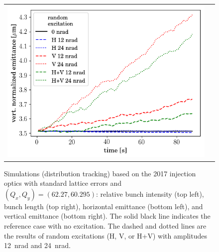 \documentclass[
prstab
,reprint
,linenumbers
,longbibliography
,preprintnumbers
,showkeys
,amsfonts,amssymb,amsmath
,floatfix
]{revtex4-1}
\newlength{\halfwidth}
\begin{document}
\begin{figure}
\begin{tabular}{cc}
    \includegraphics[width=\halfwidth]{2017injerra2b2u_ranadt_3_5um_emit2.png}\\
  \end{tabular}
  \caption{Simulations (distribution tracking) based on the 2017
    injection optics with standard lattice errors and
    $(Q_x, Q_y) = (62.27, 60.295)$: relative bunch intensity (top
    left), bunch length (top right), horizontal emittance (bottom
    left), and vertical emittance (bottom right). The solid black line
    indicates the reference case with no excitation. The dashed and
    dotted lines are the results of random excitations (H, V, or H+V)
    with amplitudes 12~nrad and 24~nrad.}
  \label{fig:ransim}
\end{figure}
\end{document}
